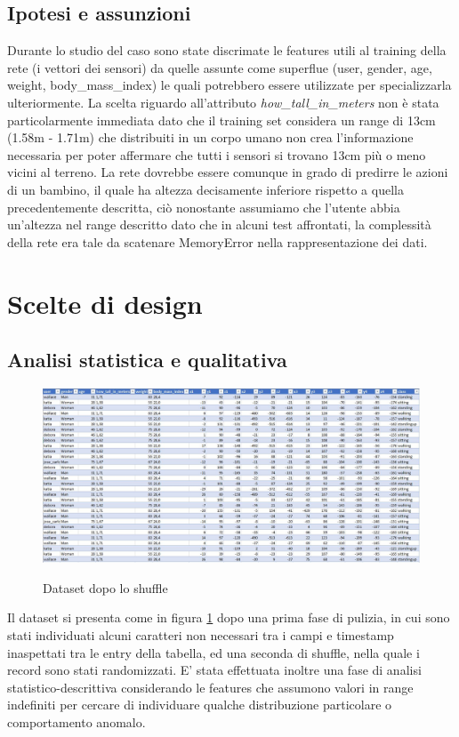 \documentclass[12pt]{article}
\begin{document}
\subsection{Ipotesi e assunzioni}
Durante lo studio del caso sono state discrimate le features utili al training della rete (i vettori dei sensori) da quelle assunte come superflue (user, gender, age, weight, body\_mass\_index) le quali potrebbero essere utilizzate per specializzarla ulteriormente.\newline
La scelta riguardo all'attributo \emph{how\_tall\_in\_meters} non è stata particolarmente immediata dato che il training set considera un range di 13cm (1.58m - 1.71m) che distribuiti in un corpo umano non crea l'informazione necessaria per poter affermare che tutti i sensori si trovano 13cm più o meno vicini al terreno. La rete dovrebbe essere comunque in grado di predirre le azioni di un bambino, il quale ha altezza decisamente inferiore rispetto a quella precedentemente descritta, ciò nonostante assumiamo che l'utente abbia un'altezza nel range descritto dato che in alcuni test affrontati, la complessità della rete era tale da scatenare MemoryError nella rappresentazione dei dati.

\section{Scelte di design}
\subsection{Analisi statistica e qualitativa}
\begin{figure}[H]
	\centering
	{\includegraphics[width=1\textwidth]{images/dataset.JPG}}
	\caption{Dataset dopo lo shuffle}
	\label{fig:dataset}
\end{figure}
Il dataset si presenta come in figura \ref{fig:dataset} dopo una prima fase di pulizia, in cui sono stati individuati alcuni caratteri non necessari tra i campi e timestamp inaspettati tra le entry della tabella, ed una seconda di shuffle, nella quale i record sono stati randomizzati. \newline
E' stata effettuata inoltre una fase di analisi statistico-descrittiva considerando le features che assumono valori in range indefiniti per cercare di individuare qualche distribuzione particolare o comportamento anomalo.
\end{document}
